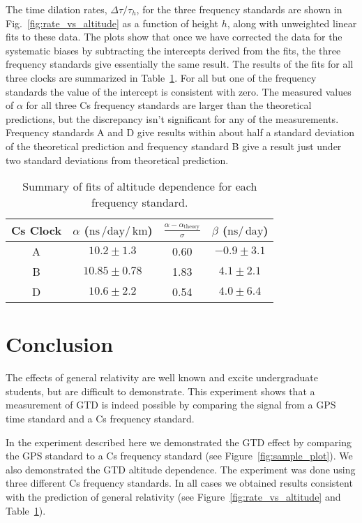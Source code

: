 \documentclass[prb,preprint]{revtex4-1}
\begin{document}
The time dilation rates, $\Delta \tau/\tau_h$, for the three frequency standards are shown in Fig.~\ref{fig:rate_vs_altitude} as a function of height $h$, along with unweighted linear fits to these data. The plots show that once we have corrected the data for the systematic biases by subtracting the intercepts derived from the fits, the three frequency standards give essentially the same result. The results of the fits for all three clocks are summarized in Table~\ref{tbl:results}. For all but one of the frequency standards the value of the intercept is consistent with zero. The measured values of $\alpha$ for all three Cs frequency standards are larger than the theoretical predictions, but the discrepancy isn't significant for any of the measurements. Frequency standards A and D give results within about half a standard deviation of the theoretical prediction and frequency standard B give a result just under two standard deviations from theoretical prediction. 
\begin{table}[ht!]
\centering
\caption{Summary of fits of altitude dependence for each frequency standard.}
\begin{ruledtabular}
\begin{tabular}{c c c c}
Cs Clock 	& $\alpha$ ($\mathrm{ns}\, /\mathrm{day}/\, \mathrm{km}$) & $\frac{\alpha - \alpha_\mathrm{theory}}{\sigma}$	& $\beta$ ($\mathrm{ns}/\, \mathrm{day}$)  \\
\hline	%
A 					& $10.2 \pm 1.3$ 										  & 0.60			& $-0.9 \pm 3.1$ \\
B 					& $10.85 \pm 0.78$ 										  & 1.83			& $4.1 \pm 2.1$ \\
D 					& $10.6 \pm 2.2$ 										  & 0.54			& $4.0 \pm 6.4$ 
\end{tabular}
\end{ruledtabular}
\label{tbl:results}
\end{table}   

\section{Conclusion}
The effects of general relativity are well known and excite undergraduate students, but are difficult to demonstrate. This experiment shows that a measurement of GTD is indeed possible by comparing the signal from a GPS time standard and a Cs frequency standard. 

In the experiment described here we demonstrated the GTD effect by comparing the GPS standard to a Cs frequency standard (see Figure~\ref{fig:sample_plot}). We also demonstrated the GTD altitude dependence. The experiment was done using three different Cs frequency standards. In all cases we obtained results consistent with the prediction of general relativity (see Figure~\ref{fig:rate_vs_altitude} and Table~\ref{tbl:results}).  
 
\end{document}
